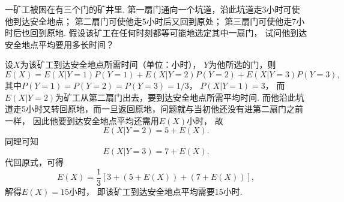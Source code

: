 \begin{example}
一矿工被困在有三个门的矿井里.
第一扇门通向一个坑道，沿此坑道走3小时可使他到达安全地点；
第二扇门可使他走5小时后又回到原处；
第三扇门可使他走7小时后也回到原地.
假设该矿工在任何时刻都等可能地选定其中一扇门，
试问他到达安全地点平均要用多长时间？
\begin{solution}
设\(X\)为该矿工到达安全地点所需时间（单位：小时），
\(Y\)为他所选的门，则\begin{equation*}
	E(X)
	= E(X \vert Y=1) P(Y=1)
	+ E(X \vert Y=2) P(Y=2)
	+ E(X \vert Y=3) P(Y=3),
\end{equation*}
其中\(P(Y=1) = P(Y=2) = P(Y=3) = 1/3\)，
\(P(X \vert Y=1) = 3\)，
而\(E(X \vert Y=2)\)为矿工从第二扇门出去，要到达安全地点所需平均时间.
而他沿此坑道走5小时又转回原地，而一旦返回原地，问题就与当初他还没有进第二扇门之前一样，
因此他要到达安全地点平均还需用\(E(X)\)小时，
故\begin{equation*}
	E(X \vert Y=2)
	= 5 + E(X).
\end{equation*}
同理可知\begin{equation*}
	E(X \vert Y=3)
	= 7 + E(X).
\end{equation*}
代回原式，可得\begin{equation*}
	E(X) = \frac13[ 3 + (5 + E(X)) + (7 + E(X)) ],
\end{equation*}
解得\(E(X) = 15\)小时，
即该矿工到达安全地点平均需要15小时.
\end{solution}
\end{example}
